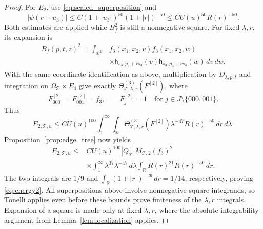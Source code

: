 \documentclass[12pt,reqno]{amsart}
\theoremstyle{plain}
\theoremstyle{definition}
\theoremstyle{remark}
\numberwithin{equation}{section}
\newcommand{\R}{\mathbb R}
\newcommand{\T}{\mathcal T}
\newcommand{\h}{\mathsf h}
\newcommand{\dd}{\,d}
\begin{document}
\begin{proof}
For $E_2$, use \eqref{eq:scaled_superposition} and
\[
 |\psi(r+u_3)|\le C(1+|u_3|)^{50}(1+|r|)^{-50}
                  \le C U(u)^{50}R(r)^{-50}.
\]
Both estimates are applied while $B_f^2$ is still a nonnegative
square. For fixed $\lambda,r$, its expansion is
\begin{align*}
 B_f(p,t,z)^2=\int_{\R^2}
 &f_3(x_1,x_2,v)f_3(x_1,x_2,w)\\
 &\times\h_{s_3,p_3+rs_3}(v)\h_{s_3,p_3+rs_3}(w)\dd v\dd w.
\end{align*}
With the same coordinate identification as above, multiplication by
$D_{\lambda,p,t}$ and integration on $\Omega_\T\times E_4$ give
exactly $\Theta^{(3)}_{\T,\lambda,r}(F^{[2]})$, where
\[
 F^{[2]}_{000}=F^{[2]}_{001}=f_3,\qquad
 F^{[2]}_j=1\quad\text{for }j\in J\setminus\{000,001\}.
\]
Thus
\begin{equation}\label{eq:second_energy_cube_comparison}
 E_{2,\T,u}\le C U(u)^{100}\int_1^\infty\int_\R
       \Theta^{(3)}_{\T,\lambda,r}(F^{[2]})
                      \lambda^{-47}R(r)^{-50}\dd r\dd\lambda.
\end{equation}
Proposition~\ref{prop:edge_tree} now yields
\begin{align*}
 E_{2,\T,u}\le{}& C U(u)^{100}|Q_\T|M_{\T,2}(f_3)^2\\
 &\times\int_1^\infty\lambda^{37}\lambda^{-47}\dd\lambda
        \int_\R R(r)^{21}R(r)^{-50}\dd r.
\end{align*}
The two integrals are $1/9$ and
$\int_\R(1+|r|)^{-29}\dd r=1/14$, respectively, proving
\eqref{eq:energy2}. All superpositions above involve nonnegative
square integrands, so Tonelli applies even before these bounds prove
finiteness of the $\lambda,r$ integrals. Expansion of a square is
made only at fixed $\lambda,r$, where the absolute integrability
argument from Lemma~\ref{lem:localization} applies.
\end{proof}
\end{document}
